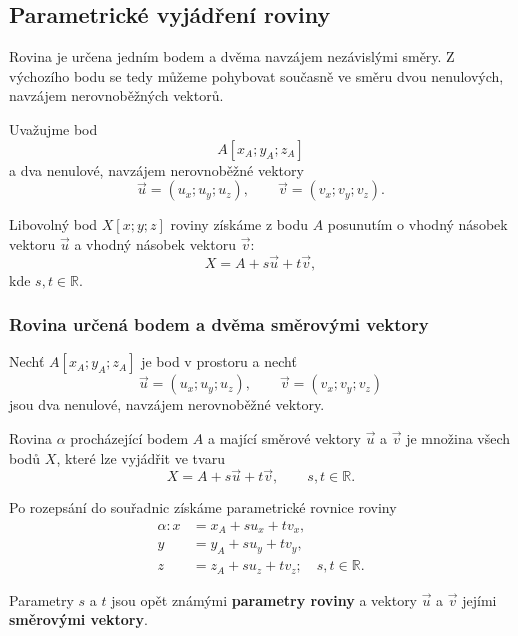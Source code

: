 \subsection{Parametrické vyjádření roviny}
\label{subsec:Parametric_plane}

Rovina je určena jedním bodem a dvěma navzájem nezávislými směry.
Z výchozího bodu se tedy můžeme pohybovat současně ve směru dvou
nenulových, navzájem nerovnoběžných vektorů.

Uvažujme bod
\[
    A[x_A;y_A;z_A]
\]
a dva nenulové, navzájem nerovnoběžné vektory
\[
    \vec{u}=(u_x;u_y;u_z),
    \qquad
    \vec{v}=(v_x;v_y;v_z).
\]

Libovolný bod $X[x;y;z]$ roviny získáme z bodu $A$ posunutím o vhodný
násobek vektoru $\vec{u}$ a vhodný násobek vektoru $\vec{v}$:
\[
    X=A+s\vec{u}+t\vec{v},
\]
kde $s,t\in\mathbb{R}$.


\subsubsection{Rovina určená bodem a dvěma směrovými vektory}
\label{subsubsec:Plane_point_two_direction_vectors}

\begin{definition}
    \label{def:Parametric_plane}

    Nechť $A[x_A;y_A;z_A]$ je bod v prostoru a nechť
    \[
        \vec{u}=(u_x;u_y;u_z),
        \qquad
        \vec{v}=(v_x;v_y;v_z)
    \]
    jsou dva nenulové, navzájem nerovnoběžné vektory.

    Rovina $\alpha$ procházející bodem $A$ a mající směrové vektory
    $\vec{u}$ a $\vec{v}$ je množina všech bodů $X$, které lze vyjádřit
    ve tvaru
    \begin{equation}
        X=A+s\vec{u}+t\vec{v},
        \qquad
        s,t\in\mathbb{R}.
        \label{eq:Parametric_plane_vector}
    \end{equation}

    Po rozepsání do souřadnic získáme parametrické rovnice roviny
    \begin{equation}
        \begin{aligned}
            \alpha: x&=x_A+s u_x+t v_x,\\
            y&=y_A+s u_y+t v_y,\\
            z&=z_A+s u_z+t v_z; \quad s,t\in\mathbb{R}.
        \end{aligned}
        \label{eq:Parametric_plane_coordinates}
    \end{equation}

    Parametry $s$ a $t$ jsou opět známými \textbf{parametry roviny} a vektory
    $\vec{u}$ a $\vec{v}$ jejími \textbf{směrovými vektory}.
\end{definition}

